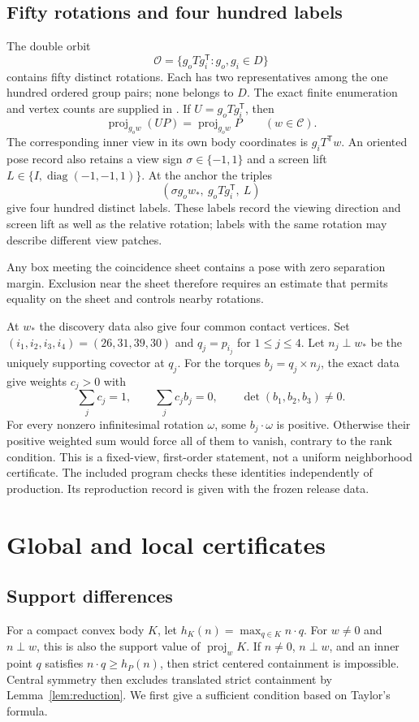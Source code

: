 \documentclass[11pt]{amsart}
\newcommand{\diag}{\operatorname{diag}}
\newcommand{\proj}{\operatorname{proj}}
\newcommand{\file}[1]{\path{#1}}
\theoremstyle{definition}
\theoremstyle{remark}
\begin{document}
\subsection{Fifty rotations and four hundred labels}
The double orbit
\begin{equation}\label{eq:orbit}
 \mathcal O=\{g_oTg_i^{\mathsf T}:g_o,g_i\in D\}
\end{equation}
contains fifty distinct rotations. Each has two representatives among
the one hundred ordered group pairs; none belongs to $D$. The exact
finite enumeration and vertex counts are supplied in \cite{hidden}.
If $U=g_oTg_i^{\mathsf T}$, then
\[
 \proj_{g_ow}(UP)=\proj_{g_ow}P\qquad(w\in\mathcal C).
\]
The corresponding inner view in its own body coordinates is
$g_iT^{\mathsf T}w$. An oriented pose record also retains a view sign
$\sigma\in\{-1,1\}$ and a screen lift
$L\in\{I,\diag(-1,-1,1)\}$. At the anchor the triples
\[
 (\sigma g_ow_*,\ g_oTg_i^{\mathsf T},\ L)
\]
give four hundred distinct labels. These labels record the viewing
direction and screen lift as well as the relative rotation; labels with
the same rotation may describe different view patches.

Any box meeting the coincidence sheet contains a pose with zero separation
margin. Exclusion near the sheet therefore requires an estimate that
permits equality on the sheet and controls nearby rotations.

At $w_*$ the discovery data also give four common contact vertices. Set
$(i_1,i_2,i_3,i_4)=(26,31,39,30)$ and $q_j=p_{i_j}$ for $1\le j\le4$.
Let $n_j\perp w_*$ be the uniquely supporting covector at $q_j$.
For the torques $b_j=q_j\times n_j$, the exact data give weights
$c_j>0$ with
\[
 \sum_j c_j=1,\qquad \sum_j c_jb_j=0,\qquad
                  \det(b_1,b_2,b_3)\ne0.
\]
For every nonzero infinitesimal rotation $\omega$, some
$b_j\cdot\omega$ is positive. Otherwise their positive weighted sum
would force all of them to vanish, contrary to the rank condition. This
is a fixed-view, first-order statement, not a uniform neighborhood
certificate. The included program \file{code/discovery/check.py} checks
these identities independently of production. Its reproduction record is
given with the frozen release data.

\section{Global and local certificates}\label{sec:certificates}

\subsection{Support differences}
For a compact convex body $K$, let $h_K(n)=\max_{q\in K}n\cdot q$.
For $w\ne0$ and $n\perp w$, this is also the support value of
$\proj_wK$. If $n\ne0$, $n\perp w$, and an inner point $q$ satisfies
$n\cdot q\ge h_P(n)$, then strict centered containment is impossible.
Central symmetry then
excludes translated strict containment by Lemma~\ref{lem:reduction}.
We first give a sufficient condition based on Taylor's formula.
\end{document}
